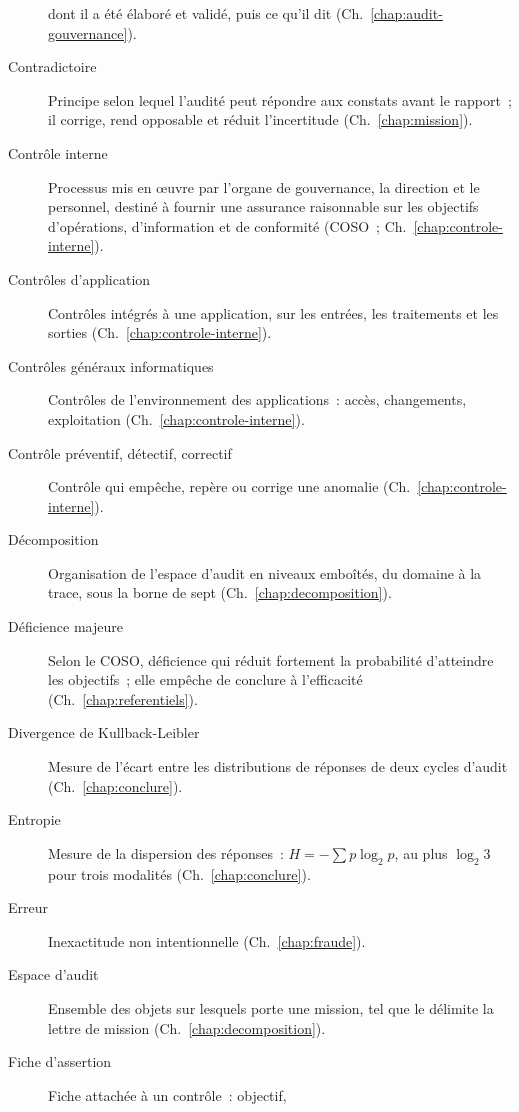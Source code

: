 \begin{description}
          dont il a été élaboré et validé, puis ce qu'il dit
          (Ch.~\ref{chap:audit-gouvernance}).
    \item[Contradictoire] Principe selon lequel l'audité peut répondre aux
          constats avant le rapport~; il corrige, rend opposable et réduit
          l'incertitude (Ch.~\ref{chap:mission}).
    \item[Contrôle interne] Processus mis en œuvre par l'organe de
          gouvernance, la direction et le personnel, destiné à fournir une
          assurance raisonnable sur les objectifs d'opérations,
          d'information et de conformité (COSO~; Ch.~\ref{chap:controle-interne}).
    \item[Contrôles d'application] Contrôles intégrés à une application,
          sur les entrées, les traitements et les sorties
          (Ch.~\ref{chap:controle-interne}).
    \item[Contrôles généraux informatiques] Contrôles de l'environnement
          des applications~: accès, changements, exploitation
          (Ch.~\ref{chap:controle-interne}).
    \item[Contrôle préventif, détectif, correctif] Contrôle qui empêche,
          repère ou corrige une anomalie (Ch.~\ref{chap:controle-interne}).
    \item[Décomposition] Organisation de l'espace d'audit en niveaux
          emboîtés, du domaine à la trace, sous la borne de sept
          (Ch.~\ref{chap:decomposition}).
    \item[Déficience majeure] Selon le COSO, déficience qui réduit fortement
          la probabilité d'atteindre les objectifs~; elle empêche de
          conclure à l'efficacité (Ch.~\ref{chap:referentiels}).
    \item[Divergence de Kullback-Leibler] Mesure de l'écart entre les
          distributions de réponses de deux cycles d'audit
          (Ch.~\ref{chap:conclure}).
    \item[Entropie] Mesure de la dispersion des réponses~:
          $H = -\sum p \log_2 p$, au plus $\log_2 3$ pour trois modalités
          (Ch.~\ref{chap:conclure}).
    \item[Erreur] Inexactitude non intentionnelle (Ch.~\ref{chap:fraude}).
    \item[Espace d'audit] Ensemble des objets sur lesquels porte une
          mission, tel que le délimite la lettre de mission
          (Ch.~\ref{chap:decomposition}).
    \item[Fiche d'assertion] Fiche attachée à un contrôle~: objectif,

\end{description}
